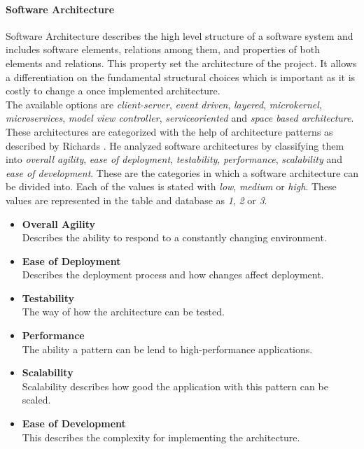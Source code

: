 \paragraph*{\textbf{Software Architecture}}
Software Architecture describes the high level structure of a software system and includes software elements, relations among them, and properties of both elements and relations. This property set the architecture of the project. It allows a differentiation on the fundamental structural choices which is important as it is costly to change a once implemented architecture.\\
The available options are \textit{client-server}, \textit{event driven}, \textit{layered}, \textit{microkernel}, \textit{microservices}, \textit{model view controller}, \textit{serviceoriented} and \textit{space based architecture}. These architectures are categorized with the help of architecture patterns as described by Richards \cite{archpatterns}. He analyzed software architectures by classifying them into \textit{overall agility}, \textit{ease of deployment}, \textit{testability}, \textit{performance}, \textit{scalability} and \textit{ease of development}. These are the categories in which a software architecture can be divided into. Each of the values is stated with \textit{low}, \textit{medium} or \textit{high}. These values are represented in the table and database as \textit{1}, \textit{2} or \textit{3}.\\
\begin{itemize}
	\item \textbf{Overall Agility}\\Describes the ability to respond to a constantly changing environment.
	\item \textbf{Ease of Deployment}\\Describes the deployment process and how changes affect deployment.
	\item \textbf{Testability}\\The way of how the architecture can be tested.
	\item \textbf{Performance}\\The ability a pattern can be lend to high-performance applications.
	\item \textbf{Scalability}\\Scalability describes how good the application with this pattern can be scaled.
	\item \textbf{Ease of Development}\\This describes the complexity for implementing the architecture.\\
\end{itemize}
